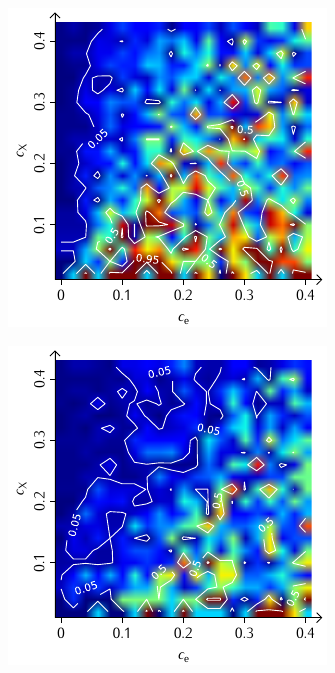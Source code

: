 \documentclass[a4paper, 10pt, twoside, openany]{book} %
\begin{document}
\begin{figure}
\begin{minipage}[t]{0.48\textwidth}
        \includegraphics[width=\textwidth]{Abbildungen/Phasendiagramme/Konturen/H_penalty_cluster_P.pdf}
        \label{H_penalty_cluster_P}
    \end{minipage}
    \begin{minipage}[t]{0.48\textwidth}
        \includegraphics[width=\textwidth]{Abbildungen/Phasendiagramme/Konturen/H_random_P.pdf}

\end{minipage}
\end{figure}
\end{document}

